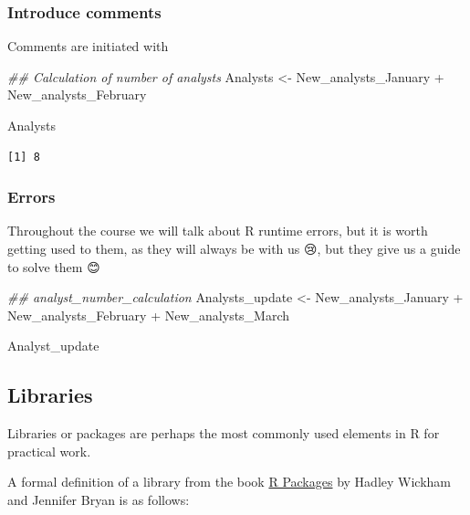 \documentclass[
  letterpaper,
  DIV=11,
  numbers=noendperiod]{scrartcl}
\newenvironment{Shaded}{\begin{snugshade}}{\end{snugshade}}
\newcommand{\DocumentationTok}[1]{\textcolor[rgb]{0.37,0.37,0.37}{\textit{#1}}}
\newcommand{\NormalTok}[1]{\textcolor[rgb]{0.00,0.23,0.31}{#1}}
\newcommand{\OtherTok}[1]{\textcolor[rgb]{0.00,0.23,0.31}{#1}}
\newcommand{\SpecialCharTok}[1]{\textcolor[rgb]{0.37,0.37,0.37}{#1}}
\begin{document}
\hypertarget{introduce-comments}{%
\subsubsection{Introduce comments}\label{introduce-comments}}

Comments are initiated with

\begin{Shaded}
\begin{Highlighting}[]
\DocumentationTok{\#\# Calculation of number of analysts}
\NormalTok{Analysts }\OtherTok{\textless{}{-}}\NormalTok{ New\_analysts\_January }\SpecialCharTok{+}\NormalTok{ New\_analysts\_February}

\NormalTok{Analysts}
\end{Highlighting}
\end{Shaded}

\begin{verbatim}
[1] 8
\end{verbatim}

\hypertarget{errors}{%
\subsubsection{Errors}\label{errors}}

Throughout the course we will talk about R runtime errors, but it is
worth getting used to them, as they will always be with us 😢, but they
give us a guide to solve them 😊

\begin{Shaded}
\begin{Highlighting}[]
\DocumentationTok{\#\# analyst\_number\_calculation}
\NormalTok{Analysts\_update }\OtherTok{\textless{}{-}}\NormalTok{ New\_analysts\_January }\SpecialCharTok{+}\NormalTok{ New\_analysts\_February }\SpecialCharTok{+}\NormalTok{ New\_analysts\_March}

\NormalTok{Analyst\_update}
\end{Highlighting}
\end{Shaded}

\hypertarget{libraries}{%
\subsection{Libraries}\label{libraries}}

Libraries or packages are perhaps the most commonly used elements in R
for practical work.

A formal definition of a library from the book
\href{https://r-pkgs.org/}{R Packages} by Hadley Wickham and Jennifer
Bryan is as follows:
\end{document}
